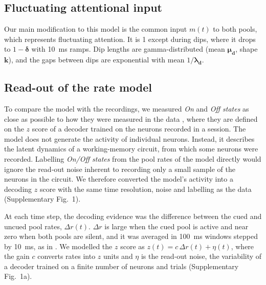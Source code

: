 \documentclass[11pt]{article}
\begin{document}
\subsection{Fluctuating attentional input}

Our main modification to this model is the common input $m(t)$ to both pools, which represents fluctuating attention.
It is 1 except during dips, where it drops to $1 - \bm{\delta}$ with 10~ms ramps.
Dip lengths are gamma-distributed (mean $\bm{\mu_d}$, shape $\bm{k}$), and the gaps between dips are exponential with mean $1/\bm{\lambda_d}$.

\subsection{Read-out of the rate model}

To compare the model with the recordings, we measured \emph{On} and \emph{Off states} as close as possible to how they were measured in the data \citep{panichello2024}, where they are defined on the $z$ score of a decoder trained on the neurons recorded in a session. The model does not generate the activity of individual neurons. Instead, it describes the latent dynamics of a working-memory circuit, from which some neurons were recorded. Labelling \emph{On/Off states} from the pool rates of the model directly would ignore the read-out noise inherent to recording only a small sample of the neurons in the circuit. We therefore converted the model's activity into a decoding $z$ score with the same time resolution, noise and labelling as the data (Supplementary Fig.~1).

At each time step, the decoding evidence was the difference between the cued and uncued pool rates, $\Delta r(t)$. $\Delta r$ is large when the cued pool is active and near zero when both pools are silent, and it was averaged in 100~ms windows stepped by 10~ms, as in \citet{panichello2024}. We modelled the $z$ score as $z(t) = c\,\Delta r(t) + \eta(t)$, where the gain $c$ converts rates into $z$ units and $\eta$ is the read-out noise, the variability of a decoder trained on a finite number of neurons and trials (Supplementary Fig.~1a).
\end{document}
